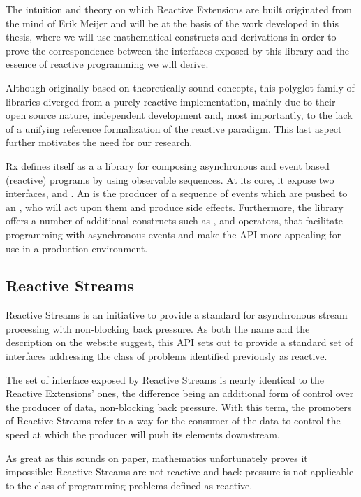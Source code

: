 The intuition and theory on which Reactive Extensions are built originated from the mind of Erik Meijer\cite{meijer2010observable} and will be at the basis of the work developed in this thesis, where we will use mathematical constructs and derivations in order to prove the correspondence between the interfaces exposed by this library and the essence of reactive programming we will derive.

Although originally based on theoretically sound concepts, this polyglot family of libraries diverged from a purely reactive implementation, mainly due to their open source nature, independent development and, most importantly, to the lack of a unifying reference formalization of the reactive paradigm. This last aspect further motivates the need for our research.

Rx defines itself as a a library for composing asynchronous and event based (reactive) programs by using observable sequences\cite{Rx.Net}. At its core, it expose two interfaces,  and . An  is the producer of a sequence of events which are pushed to an , who will act upon them and produce side effects. Furthermore, the library offers a number of additional constructs such as ,  and operators, that facilitate programming with asynchronous events and make the API more appealing for use in a production environment.

\subsection{Reactive Streams}

Reactive Streams is an initiative to provide a standard for asynchronous stream processing with non-blocking back pressure\cite{Reactive-Streams}. As both the name and the description on the website\cite{Reactive-Streams} suggest, this API sets out to provide a standard set of interfaces addressing the class of problems identified previously as reactive. 

The set of interface exposed by Reactive Streams is nearly identical to the Reactive Extensions' ones, the difference being an additional form of control over the producer of data, non-blocking back pressure. With this term, the promoters of Reactive Streams refer to a way for the consumer of the data to control the speed at which the producer will push its elements downstream. 

As great as this sounds on paper, mathematics unfortunately proves it impossible: Reactive Streams are not reactive and back pressure is not applicable to the class of programming problems defined as reactive.

